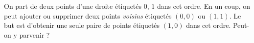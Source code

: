 On part de deux points d'une droite étiquetés $0$, $1$ dans cet ordre. En un coup, on peut ajouter ou supprimer deux points \emph{voisins} étiquetés $(0, 0)$ ou $(1, 1)$. Le but est d'obtenir une seule paire de points étiquetés $(1, 0)$ dans cet ordre. Peut-on y parvenir ?
